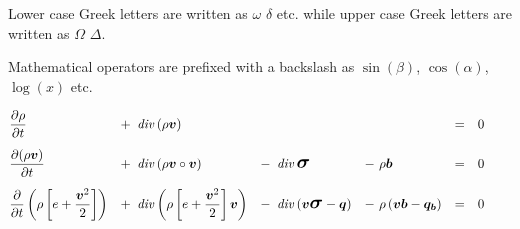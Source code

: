 Lower case Greek letters are written as $\omega$ $\delta$ etc. while upper case Greek letters are written as $\Omega$ $\Delta$.

Mathematical operators are prefixed with a backslash as $\sin(\beta)$, $\cos(\alpha)$, $\log(x)$ etc.

    {
        \small
        \begin{subequations}
            \begin{align}
                \label{Bilanzgleichungen in konservativer differentieller Form a}
                              & \pfrac{\rho}{t}           & + \      & \diverg \left( \rho \tvec{v} \right) &  &  &  &  & =
                \quad         & 0 \qquad
                \\[.5em]
                \label{Bilanzgleichungen in konservativer differentieller Form b}
                              & \pfrac{(\rho\tvec{v})}{t}
                              & + \                       &
                \diverg \left( \rho \tvec{v} \circ \tvec{v} \right)
                              & - \                       &
                \diverg \tenstress
                              & - \                       &
                \rho \tvec{b} & = \quad                   & 0 \qquad
                \\[.5em]
                \label{Bilanzgleichungen in konservativer differentieller Form c}
                              & \pfracbig{                                                                                  %
                    \left(
                    \rho \left[ e + \frac{\tvec{v}^2}{2} \right]
                    \right)}{t}
                              & + \                       &
                \diverg \left(
                \rho \left[ e + \frac{\tvec{v}^2}{2} \right] \tvec{v}
                \right)
                              & - \                       &
                \diverg \left( \tvec{v} \tenstress - \tvec{q} \right)
                              & - \                       &
                \rho \left( \tvec{v} \tvec{b} - \tvec{q_b} \right)
                              & = \quad                   & 0 \qquad
            \end{align}
        \end{subequations}
    }

